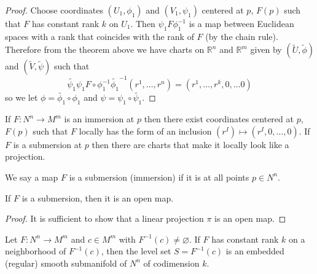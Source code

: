 \begin{proof}
Choose coordinates $(U_1, \phi_1)$ and $(V_1, \psi_1)$ centered at
$p$, $F(p)$ such that $F$ has constant rank $k$ on $U_1$. Then
$\psi_1 F \phi_1^{-1}$ is a map between Euclidean spaces with a rank
that coincides with the rank of $F$ (by the chain rule). Therefore
from the theorem above we have charts on $\mathbb{R}^n$ and
$\mathbb{R}^m$ given by
$(\tilde{U}, \tilde{\phi})$ and $(\tilde{V}, \tilde{\psi})$ such that
$$
  \tilde{\psi_1} \psi_1 F \circ \phi_1^{-1} \tilde{\phi_1}^{-1}
    (r^1, \dots, r^n)
=   (r^1, \dots, r^k, 0, \dots 0)
$$
so we let $\phi = \tilde{\phi_1} \circ \phi_1$ and
$\psi = \psi_1 \circ \tilde{\psi_1}$.
\end{proof}

\begin{corol}
If $F: N^n \to M^m$ is an immersion at $p$ then there exist
coordinates centered at $p$, $F(p)$ such that $F$ locally has the form
of an inclusion $(r^I) \mapsto (r^I, 0, \dots, 0)$. If $F$ is a
submersion at $p$ then there are charts that make it locally look like
a projection.
\end{corol}

\begin{defn}
We say a map $F$ is a submersion (immersion) if it is at all points $p
\in N^n$.
\end{defn}

\begin{corol}
If $F$ is a submersion, then it is an open map.
\end{corol}

\begin{proof}
It is sufficient to show that a linear projection $\pi$ is an open map.
\end{proof}

\begin{theorem}
Let $F: N^n \to M^m$ and $c \in M^m$ with $F^{-1}(c) \neq
\varnothing$. If $F$ has constant rank $k$ on a neighborhood of
$F^{-1}(c)$, then the level set $S = F^{-1}(c)$ is an embedded
(regular) smooth submanifold of $N^n$ of codimension $k$.
\end{theorem}

